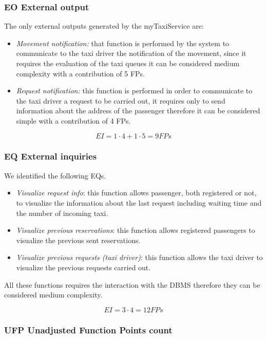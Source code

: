 \subsubsection{EO External output}

The only external outputs generated by the myTaxiService are:
\begin{itemize}
\item \emph{Movement notification: }that function is performed by the system
to communicate to the taxi driver the notification of the movement,
since it requires the evaluation of the taxi queues it can be considered
medium complexity with a contribution of 5 FPs.
\item \emph{Request notification: }this function is performed in order to
communicate to the taxi driver a request to be carried out, it requires
only to send information about the address of the passenger therefore
it can be considered simple with a contribution of 4 FPs.
\end{itemize}
\[
EI=1\cdot4+1\cdot5=9FPs
\]



\subsubsection{EQ External inquiries}

We identified the following EQs.
\begin{itemize}
\item \emph{Visualize request info}: this function allows passenger, both
registered or not, to visualize the information about the last request
including waiting time and the number of incoming taxi.
\item \emph{Visualize previous reservations}: this function allows registered
passengers to visualize the previous sent reservations.
\item \emph{Visualize previous requests (taxi driver)}: this function allows
the taxi driver to visualize the previous requests carried out.
\end{itemize}
All these functions requires the interaction with the DBMS therefore
they can be considered medium complexity.

\[
EI=3\cdot4=12FPs
\]



\subsubsection{UFP Unadjusted Function Points count}

